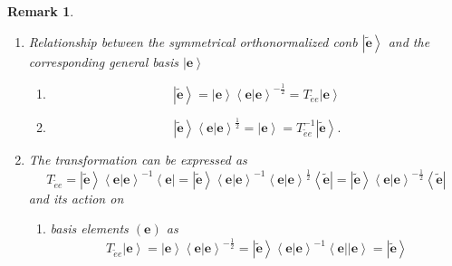 \documentclass[aps,preprint]{revtex4}%
\newtheorem{remark}[theorem]{Remark}
\begin{document}
\begin{remark}
\begin{enumerate}
\item Relationship between the symmetrical orthonormalized conb $\left\vert
\widetilde{\mathbf{e}}\right\rangle $ and the corresponding general basis
$\left\vert \mathbf{e}\right\rangle $

\begin{enumerate}
\item
\begin{equation}
\left\vert \widetilde{\mathbf{e}}\right\rangle =\left\vert \mathbf{e}%
\right\rangle \left\langle \left.  \mathbf{e}\right\vert \mathbf{e}%
\right\rangle ^{-\frac{1}{2}}=T_{\widetilde{e}e}\left\vert \mathbf{e}%
\right\rangle
\end{equation}


\item
\begin{equation}
\left\vert \widetilde{\mathbf{e}}\right\rangle \left\langle \left.
\mathbf{e}\right\vert \mathbf{e}\right\rangle ^{\frac{1}{2}}=\left\vert
\mathbf{e}\right\rangle =T_{\widetilde{e}e}^{-1}\left\vert
\widetilde{\mathbf{e}}\right\rangle .
\end{equation}

\end{enumerate}

\item The transformation can be expressed as
\begin{equation}
T_{\widetilde{e}e}=\left\vert \widetilde{\mathbf{e}}\right\rangle \left\langle
\left.  \mathbf{e}\right\vert \mathbf{e}\right\rangle ^{-1}\left\langle
\mathbf{e}\right\vert =\left\vert \widetilde{\mathbf{e}}\right\rangle
\left\langle \left.  \mathbf{e}\right\vert \mathbf{e}\right\rangle
^{-1}\left\langle \left.  \mathbf{e}\right\vert \mathbf{e}\right\rangle
^{\frac{1}{2}}\left\langle \widetilde{\mathbf{e}}\right\vert =\left\vert
\widetilde{\mathbf{e}}\right\rangle \left\langle \left.  \mathbf{e}\right\vert
\mathbf{e}\right\rangle ^{-\frac{1}{2}}\left\langle \widetilde{\mathbf{e}%
}\right\vert
\end{equation}
and its action on

\begin{enumerate}
\item basis elements $\left(  \mathbf{e}\right)  $ as
\begin{equation}
T_{\widetilde{e}e}\left\vert \mathbf{e}\right\rangle =\left\vert
\mathbf{e}\right\rangle \left\langle \left.  \mathbf{e}\right\vert
\mathbf{e}\right\rangle ^{-\frac{1}{2}}=\left\vert \widetilde{\mathbf{e}%
}\right\rangle \left\langle \left.  \mathbf{e}\right\vert \mathbf{e}%
\right\rangle ^{-1}\left\langle \mathbf{e}\right\vert \left\vert
\mathbf{e}\right\rangle =\left\vert \widetilde{\mathbf{e}}\right\rangle
\end{equation}



\end{enumerate}
\end{enumerate}
\end{remark}
\end{document}
